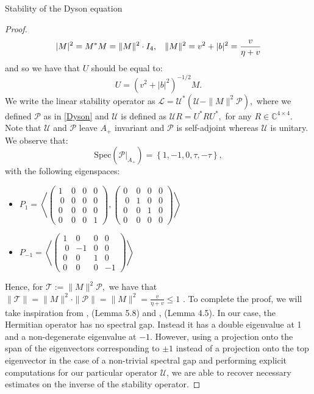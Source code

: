 \documentclass[11pt, a4paper, oneside]{book}
\numberwithin{equation}{chapter}
\newcommand{\UU}{\mathcal{U}}
\begin{document}
\begin{section}{Stability of the Dyson equation}
\begin{proof}
%
\[
|M|^2 = M^*M = \|M\|^2 \cdot I_4,\hspace{3mm} \|M\|^2= v^2+|b|^2 = \frac{v}{\eta+v}
\]
and so we have that $U$ should be equal to:
\[
U = (v^2 + |b|^2)^{-1/2} M .
\]
%
We write the linear stability operator as
$ \mathscr{L} = \mathcal{U}^*(\mathcal{U} - \|M\|^2\mathscr{P}),$ where we defined $\mathscr{P}$ as in \eqref{Dyson} and $\mathcal{U}$ is defined as $\mathcal{U}R = U^* R U^*,$ for any $R \in \mathbb{C}^{4 \times 4}.$ Note that $\mathcal{U}$ and $\mathscr{P}$ leave $A_+$ invariant and $\mathscr{P}$ is self-adjoint whereas $\mathcal{U}$ is unitary. We observe that:
\[
\mathrm{Spec}(\mathscr{P}|_{A_+}) = \left \{ 1,-1,0, \tau, -\tau \right \},
\]
with the following eigenspaces: 
\begin{itemize}
    \item $ P_1 = \left \langle \begin{pmatrix}
        1 & 0 & 0 & 0 \\ \ 0 & 0 & 0 & 0 \\ 0 & 0 & 0 & 0 \\ 0 & 0 & 0 & 1
    \end{pmatrix}   ,
    \begin{pmatrix}
        0 & 0 & 0 & 0 \\ \ 0 & 1 & 0 & 0 \\ 0 & 0 & 1 & 0 \\ 0 & 0 & 0 & 0
    \end{pmatrix}  \right \rangle $
    \item $ P_{-1} = \left \langle \begin{pmatrix}
        1 & 0 & 0 & 0 \\ \ 0 & -1 & 0 & 0 \\ 0 & 0 & 1 & 0 \\ 0 & 0 & 0 & -1
    \end{pmatrix} \right \rangle $
\end{itemize}
%
Hence, for $\mathcal{T} :=\|M\|^2 \mathscr{P},$ we have that $\|\mathcal{T}\|= \|M\|^2 \cdot \|\mathscr{P}\| = \|M\|^2 = \frac{v}{\eta+v}\leq 1$ .
%
To complete the proof, we will take inspiration from \cite{ajanki2017singularities}, (Lemma 5.8) and \cite{alt2022local}, (Lemma 4.5). In our case, the Hermitian operator has no spectral gap. Instead it has a double eigenvalue at 1 and a non-degenerate eigenvalue at $-1$. However, using a projection onto the span of the eigenvectors corresponding to $\pm 1$ instead of a projection onto the top eigenvector in the case of a non-trivial spectral gap and performing explicit computations for our particular operator $\UU$, we are able to recover necessary estimates on the inverse of the stability operator. 


\end{proof}
\end{section}
\end{document}
